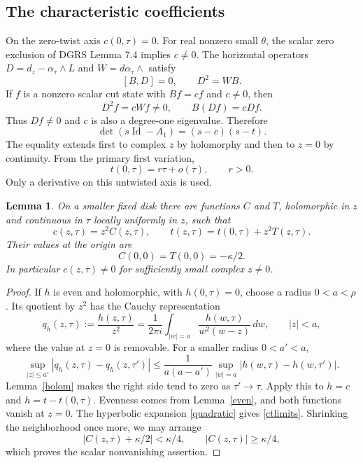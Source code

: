 \documentclass[11pt,letterpaper,reqno]{amsart}
\newtheorem{lemma}[theorem]{Lemma}
\theoremstyle{remark}
\newcommand{\Id}{\operatorname{Id}}
\begin{document}
\subsection{The characteristic coefficients}
On the zero-twist axis $c(0,\tau)=0$. For real nonzero small $\theta$, the scalar
zero exclusion of DGRS Lemma 7.4 implies $c\neq0$. The horizontal
operators $D=d_z-\alpha_\tau\wedge L$ and $W=d\alpha_\tau\wedge$
satisfy
\begin{equation}\label{Cartan}
 [B,D]=0,\qquad D^2=WB.
\end{equation}
If $f$ is a nonzero scalar cut state with $Bf=cf$ and $c\ne0$, then
\[
 D^2f=cWf\ne0,\qquad B(Df)=cDf.
\]
Thus $Df\ne0$ and $c$ is also a degree-one eigenvalue. Therefore
\begin{equation}\label{P1}
 \det(s\Id-A_1)=(s-c)(s-t).
\end{equation}
The equality extends first to complex $z$ by holomorphy and then to
$z=0$ by continuity. From the primary first variation,
\begin{equation}\label{taxis}
 t(0,\tau)=r\tau+o(\tau),\qquad r>0.
\end{equation}
Only a derivative on this untwisted axis is used.


\begin{lemma}\label{scalarfactors}
On a smaller fixed disk there are functions $C$ and $T$, holomorphic in
$z$ and continuous in $\tau$ locally uniformly in $z$, such that
\begin{equation}\label{ctfactors}
 c(z,\tau)=z^2C(z,\tau),\qquad
 t(z,\tau)=t(0,\tau)+z^2T(z,\tau).
\end{equation}
Their values at the origin are
\begin{equation}\label{ctlimits}
 C(0,0)=T(0,0)=-\kappa/2.
\end{equation}
In particular $c(z,\tau)\ne0$ for sufficiently small complex $z\ne0$.
\end{lemma}
\begin{proof}
If $h$ is even and holomorphic, with $h(0,\tau)=0$, choose a radius
$0<a<\rho$. Its quotient by $z^2$ has the Cauchy representation
\begin{equation}\label{Cauchyquotient}
 q_h(z,\tau):=\frac{h(z,\tau)}{z^2}
 =\frac{1}{2\pi i}\int_{|w|=a}
       \frac{h(w,\tau)}{w^2(w-z)}\,dw,
 \qquad |z|<a,
\end{equation}
where the value at $z=0$ is removable. For a smaller radius $0<a'<a$,
\begin{equation}\label{quotientcontinuity}
 \sup_{|z|\leq a'}|q_h(z,\tau)-q_h(z,\tau')|
 \leq\frac{1}{a(a-a')}
   \sup_{|w|=a}|h(w,\tau)-h(w,\tau')|.
\end{equation}
Lemma~\ref{holom} makes the right side tend to zero as $\tau'\to\tau$.
Apply this to $h=c$ and $h=t-t(0,\tau)$. Evenness comes from
Lemma~\ref{even}, and both functions vanish at $z=0$. The hyperbolic
expansion \eqref{quadratic} gives \eqref{ctlimits}. Shrinking the
neighborhood once more, we may arrange
\[
 |C(z,\tau)+\kappa/2|<\kappa/4,
 \qquad |C(z,\tau)|\geq\kappa/4,
\]
which proves the scalar nonvanishing assertion.
\end{proof}
\end{document}
